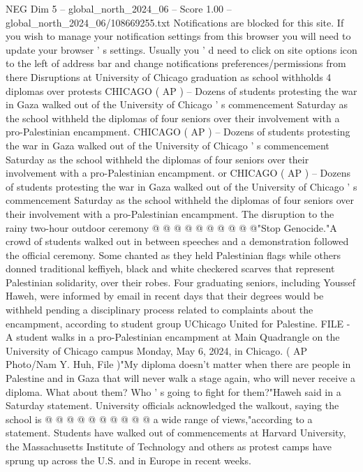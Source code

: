 \begin{textsample}{NEG Dim 5 – global\_north\_2024\_06 – Score 1.00 – global\_north\_2024\_06/108669255.txt}  \label{ex:f5_neg_134}
Notifications are blocked for this site.
If you wish to manage your notification settings from this browser you will need to update your browser ' s settings.
Usually you ' d need to click on site options icon to the left of address bar and change notifications preferences/permissions from there Disruptions at University of Chicago graduation as school withholds 4 diplomas over protests CHICAGO ( AP ) -- Dozens of students protesting the war in Gaza walked out of the University of Chicago ' s commencement Saturday as the school withheld the diplomas of four seniors over their involvement with a pro-Palestinian encampment.
CHICAGO ( AP ) -- Dozens of students protesting the war in Gaza walked out of the University of Chicago ' s commencement Saturday as the school withheld the diplomas of four seniors over their involvement with a pro-Palestinian encampment. or CHICAGO ( AP ) -- Dozens of students protesting the war in Gaza walked out of the University of Chicago ' s commencement Saturday as the school withheld the diplomas of four seniors over their involvement with a pro-Palestinian encampment.
The disruption to the rainy two-hour outdoor ceremony @ @ @ @ @ @ @ @ @ @"Stop Genocide."A crowd of students walked out in between speeches and a demonstration followed the official ceremony.
Some chanted as they held Palestinian flags while others donned traditional keffiyeh, black and white checkered scarves that represent Palestinian solidarity, over their robes.
Four graduating seniors, including Youssef Haweh, were informed by email in recent days that their degrees would be withheld pending a disciplinary process related to complaints about the encampment, according to student group UChicago United for Palestine.
FILE - A student walks in a pro-Palestinian encampment at Main Quadrangle on the University of Chicago campus Monday, May 6, 2024, in Chicago. ( AP Photo/Nam Y.
Huh, File )"My diploma doesn't matter when there are people in Palestine and in Gaza that will never walk a stage again, who will never receive a diploma.
What about them?
Who ' s going to fight for them?"Haweh said in a Saturday statement.
University officials acknowledged the walkout, saying the school is @ @ @ @ @ @ @ @ @ @ a wide range of views,"according to a statement.
Students have walked out of commencements at Harvard University, the Massachusetts Institute of Technology and others as protest camps have sprung up across the U.S. and in Europe in recent weeks.

\end{textsample}
